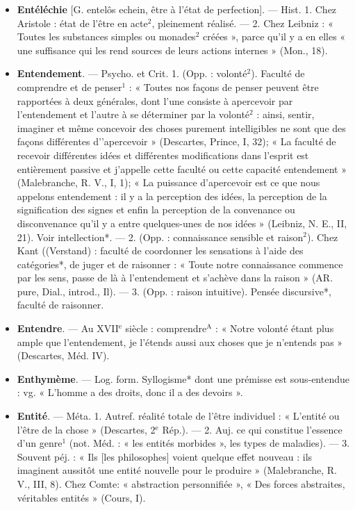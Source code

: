 \begin{itemize}[leftmargin=1cm, label=, itemsep=1pt]
\item {\bf Entéléchie} [G. entelôs echein, être à
l'état de perfection]. — Hist. 1.
Chez Aristole : état de l'être en
acte$^2$, pleinement réalisé. — 2. Chez
Leibniz : « Toutes les substances
simples ou monades$^2$ créées », parce
qu’il y a en elles « une suffisance
qui les rend sources de leurs actions
internes » (Mon., 18).

\item {\bf Entendement}. — Psycho. et Crit. 1.
(Opp. : volonté$^2$). Faculté de comprendre et de penser$^1$ : « Toutes nos
façons de penser peuvent être rapportées à deux générales, dont l’une
consiste à apercevoir par l’entendement et l’autre à se déterminer par
la volonté$^2$ : ainsi, sentir, imaginer
et même concevoir des choses purement intelligibles ne sont que des
façons différentes d’'apercevoir »
(Descartes, Prince, I, 32); « La
faculté de recevoir différentes idées
et différentes modifications dans
l'esprit est entièrement passive et
j'appelle cette faculté ou cette capacité entendement » (Malebranche,
R. V., I, 1); « La puissance d’apercevoir est ce que nous appelons
entendement : il y a la perception
des idées, la perception de la signification des signes et enfin la perception de la convenance ou disconvenance qu'il y a entre quelques-unes de nos idées » (Leibniz, N. E.,
II, 21). Voir intellection*. — 2.
(Opp. : connaissance sensible et
raison$^2$). Chez Kant ((Verstand) :
faculté de coordonner les sensations à l’aide des catégories*, de
juger et de raisonner : « Toute notre
connaissance commence par les sens,
passe de là à l’entendement et
s'achève dans la raison » (AR. pure,
Dial., introd., Il). — 3. (Opp. :
raison intuitive). Pensée discursive*,
faculté de raisonner.

\item {\bf Entendre}. — Au XVII$^\text{e}$ siècle : comprendre$^\text{A}$ : « Notre volonté étant
plus ample que l’entendement, je
l’étends aussi aux choses que je
n'entends pas » (Descartes, Méd.
IV).

\item {\bf Enthymème}. — Log. form. Syllogisme* dont une prémisse est sous-entendue : vg. « L'homme a des
droits, donc il a des devoirs ».

\item {\bf Entité}. — Méta. 1. Autref. réalité
totale de l'être individuel : « L’entité ou l'être de la chose » (Descartes, 2$^\text{e}$ Rép.). — 2. Auj. ce qui
constitue l’essence d’un genre$^1$ (not.
Méd. : « les entités morbides », les
types de maladies). — 3. Souvent
péj. : « Ils [les philosophes] voient
quelque effet nouveau : ils imaginent aussitôt une entité nouvelle
pour le produire » (Malebranche,
R. V., III, 8). Chez Comte: « abstraction personnifiée », « Des forces
abstraites, véritables entités »
(Cours, I).


\end{itemize}
